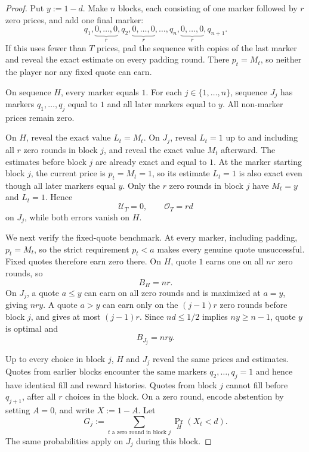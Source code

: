 \documentclass[11pt]{article}
\theoremstyle{remark}
\newcommand{\cU}{\mathcal U}
\newcommand{\cO}{\mathcal O}
\begin{document}
\begin{proof}
Put $y:=1-d$.  Make $n$ blocks, each consisting of one marker followed by
$r$ zero prices, and add one final marker:
\[
  q_1,\underbrace{0,\ldots,0}_{r},
  q_2,\underbrace{0,\ldots,0}_{r},\ldots,
  q_n,\underbrace{0,\ldots,0}_{r},q_{n+1}.
\]
If this uses fewer than $T$ prices, pad the sequence with copies of the last
marker and reveal the exact estimate on every padding round.  There
$p_t=M_t$, so neither the player nor any fixed quote can earn.

On sequence $H$, every marker equals $1$.  For each $j\in\{1,\ldots,n\}$,
sequence $J_j$ has markers $q_1,\ldots,q_j$ equal to $1$ and all later
markers equal to $y$.  All non-marker prices remain zero.

On $H$, reveal the exact value $L_t=M_t$.  On $J_j$, reveal $L_t=1$ up to and
including all $r$ zero rounds in block $j$, and reveal the exact value $M_t$
afterward.
The estimates before block $j$ are already exact and equal to $1$.  At the
marker starting block $j$, the current price is $p_t=M_t=1$, so its estimate
$L_t=1$ is also exact even though all later markers equal $y$.  Only the $r$
zero rounds in block $j$ have $M_t=y$ and $L_t=1$.  Hence
\begin{equation}\label{eq:block-errors}
  \cU_T=0,
  \qquad
  \cO_T=rd
\end{equation}
on $J_j$, while both errors vanish on $H$.

We next verify the fixed-quote benchmark.  At every marker, including
padding, $p_t=M_t$, so the strict requirement $p_t<a$ makes every genuine
quote unsuccessful.  Fixed quotes therefore earn zero there.  On $H$, quote
$1$ earns one on all $nr$ zero rounds, so
\begin{equation}\label{eq:BH}
  B_H=nr.
\end{equation}
On $J_j$, a quote $a\le y$ can earn on all zero rounds and is maximized at
$a=y$, giving $nry$.  A quote $a>y$ can earn only on the $(j-1)r$ zero
rounds before block $j$, and gives at most $(j-1)r$.  Since $nd\le1/2$
implies $ny\ge n-1$, quote $y$ is optimal and
\begin{equation}\label{eq:BJ}
  B_{J_j}=nry.
\end{equation}

Up to every choice in block $j$, $H$ and $J_j$ reveal the same prices and
estimates.  Quotes from earlier blocks encounter the same markers
$q_2,\ldots,q_j=1$ and hence have identical fill and reward histories.  Quotes
from block $j$ cannot fill before $q_{j+1}$, after all $r$ choices in the
block.  On a zero round, encode abstention by setting $A=0$, and write
$X:=1-A$.
Let
\[
  G_j:=\sum_{t\text{ a zero round in block }j}
         \Pr_H(X_t<d).
\]
The same probabilities apply on $J_j$ during this block.


\end{proof}
\end{document}
